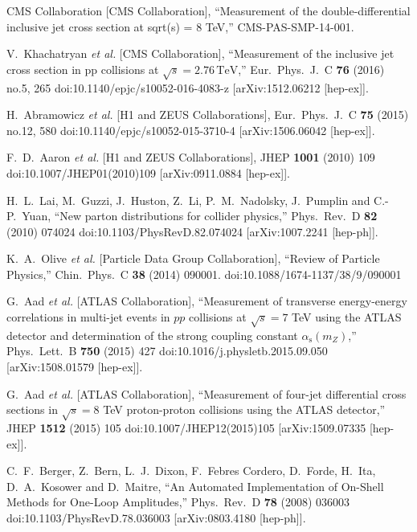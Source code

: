 \documentclass{PoS}
\begin{document}
\begin{thebibliography}{99}
  CMS Collaboration [CMS Collaboration],
  ``Measurement of the double-differential inclusive jet cross section at sqrt(s) = 8 TeV,''
  CMS-PAS-SMP-14-001.

  V.~Khachatryan {\it et al.} [CMS Collaboration],
  ``Measurement of the inclusive jet cross section in pp collisions at $\sqrt{s} = 2.76\,\text {TeV}$,''
  Eur.\ Phys.\ J.\ C {\bf 76} (2016) no.5,  265
  doi:10.1140/epjc/s10052-016-4083-z
  [arXiv:1512.06212 [hep-ex]].

  H.~Abramowicz {\it et al.} [H1 and ZEUS Collaborations],
  Eur.\ Phys.\ J.\ C {\bf 75} (2015) no.12,  580
  doi:10.1140/epjc/s10052-015-3710-4
  [arXiv:1506.06042 [hep-ex]].

  F.~D.~Aaron {\it et al.} [H1 and ZEUS Collaborations],
  JHEP {\bf 1001} (2010) 109
  doi:10.1007/JHEP01(2010)109
  [arXiv:0911.0884 [hep-ex]].

  H.~L.~Lai, M.~Guzzi, J.~Huston, Z.~Li, P.~M.~Nadolsky, J.~Pumplin and C.-P.~Yuan,
  ``New parton distributions for collider physics,''
  Phys.\ Rev.\ D {\bf 82} (2010) 074024
  doi:10.1103/PhysRevD.82.074024
  [arXiv:1007.2241 [hep-ph]].

  K.~A.~Olive {\it et al.} [Particle Data Group Collaboration],
  ``Review of Particle Physics,''
  Chin.\ Phys.\ C {\bf 38} (2014) 090001.
  doi:10.1088/1674-1137/38/9/090001

  G.~Aad {\it et al.} [ATLAS Collaboration],
  ``Measurement of transverse energy-energy correlations in multi-jet events in $pp$ collisions at $\sqrt{s} = 7$ TeV using the ATLAS detector and determination of the strong coupling constant $\alpha_{\mathrm{s}}(m_Z)$,''
  Phys.\ Lett.\ B {\bf 750} (2015) 427
  doi:10.1016/j.physletb.2015.09.050
  [arXiv:1508.01579 [hep-ex]]. 

  G.~Aad {\it et al.} [ATLAS Collaboration],
  ``Measurement of four-jet differential cross sections in $\sqrt{s}=8$ TeV proton-proton collisions using the ATLAS detector,''
  JHEP {\bf 1512} (2015) 105
  doi:10.1007/JHEP12(2015)105
  [arXiv:1509.07335 [hep-ex]].

  C.~F.~Berger, Z.~Bern, L.~J.~Dixon, F.~Febres Cordero, D.~Forde, H.~Ita, D.~A.~Kosower and D.~Maitre,
  ``An Automated Implementation of On-Shell Methods for One-Loop Amplitudes,''
  Phys.\ Rev.\ D {\bf 78} (2008) 036003
  doi:10.1103/PhysRevD.78.036003
  [arXiv:0803.4180 [hep-ph]].


\end{thebibliography}
\end{document}
